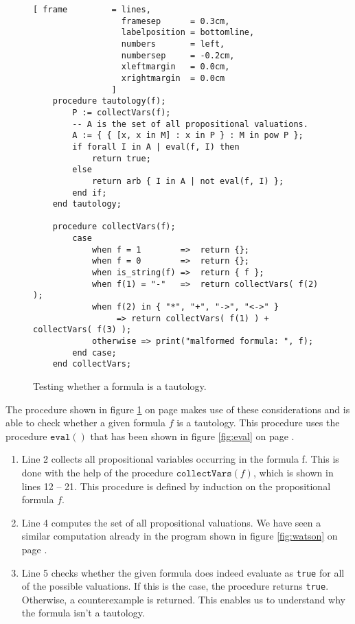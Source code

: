 \begin{figure}[!ht]
  \centering
\begin{Verbatim}[ frame         = lines, 
                  framesep      = 0.3cm, 
                  labelposition = bottomline,
                  numbers       = left,
                  numbersep     = -0.2cm,
                  xleftmargin   = 0.0cm,
                  xrightmargin  = 0.0cm
                ]
    procedure tautology(f);
        P := collectVars(f);
        -- A is the set of all propositional valuations.
        A := { { [x, x in M] : x in P } : M in pow P };
        if forall I in A | eval(f, I) then
            return true;
        else
            return arb { I in A | not eval(f, I) };
        end if;
    end tautology;

    procedure collectVars(f);
        case
            when f = 1        =>  return {};
            when f = 0        =>  return {};
            when is_string(f) =>  return { f };
            when f(1) = "-"   =>  return collectVars( f(2) );
            when f(2) in { "*", "+", "->", "<->" } 
                 => return collectVars( f(1) ) + collectVars( f(3) );
            otherwise => print("malformed formula: ", f);
        end case;
    end collectVars;
\end{Verbatim}
\vspace*{-0.3cm}
  \caption{Testing whether a formula is a tautology.}
  \label{fig:tautology}
\end{figure} 

\noindent
The procedure shown in figure \ref{fig:tautology} on page \pageref{fig:tautology} makes use of these
considerations and is able to check whether a given formula  $f$ is a tautology.
This procedure uses the procedure $\texttt{eval}()$ that has been shown in figure
\ref{fig:eval} on page \pageref{fig:eval}.
\begin{enumerate}
\item Line 2 collects all propositional variables occurring in the formula f.
      This is done with the help of the procedure $\texttt{collectVars}(f)$, which is shown
      in lines 12 -- 21.  This procedure is defined by induction on the propositional formula $f$.      
\item Line 4 computes the set of all propositional valuations.
      We have seen a similar computation already in the program shown in figure \ref{fig:watson} on
      page \pageref{fig:watson}.
\item Line 5 checks whether the given formula does indeed evaluate as \texttt{true} for all
      of the possible valuations.  If this is the case, the procedure returns \texttt{true}.
      Otherwise, a counterexample is returned.  This enables us to understand why the formula isn't
      a tautology.
\end{enumerate}

